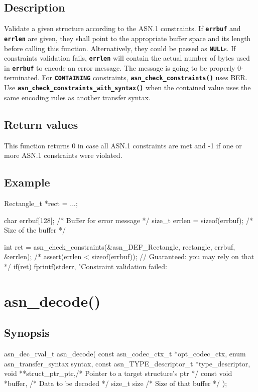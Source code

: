 \documentclass[english,oneside,12pt]{book}
\newcommand{\apisection}[2]{\clearpage\section{\label{#1}#2}}
\newcommand{\code}[1]{\texttt{\textbf{\lstinline{#1}}}}
\begin{document}
\subsection*{Description}

Validate a given structure according to the ASN.1 constraints.
If \code{errbuf} and \code{errlen} are given, they shall point to the
appropriate buffer space and its length before calling this function.
Alternatively, they could be passed as \code{NULL}s.
If constraints validation fails, \code{errlen} will contain the actual
number of bytes used in \code{errbuf} to encode an error message.
The message is going to be properly 0-terminated.
For \code{CONTAINING} constraints, \code{asn_check_constraints()} uses BER.
Use \code{asn_check_constraints_with_syntax()} when the contained value uses
the same encoding rules as another transfer syntax.

\subsection*{Return values}

This function returns 0 in case all ASN.1 constraints are met
and -1 if one or more ASN.1 constraints were violated.

\subsection*{Example}

\begin{codesample}[basicstyle=\scriptsize\listingfont,literate={-}{{\char45}}1]
Rectangle_t *rect = ...;

char errbuf[128];  /* Buffer for error message */
size_t errlen = sizeof(errbuf);  /* Size of the buffer */

int ret = asn_check_constraints(&asn_DEF_Rectangle, rectangle, errbuf, &errlen);
/* assert(errlen < sizeof(errbuf)); // Guaranteed: you may rely on that */
if(ret) {
    fprintf(stderr, "Constraint validation failed: %
}
\end{codesample}

\apisection{sec:asn_decode}{asn\_decode()}

\subsection*{Synopsis}
\begin{signature}
asn_dec_rval_t asn_decode(
    const asn_codec_ctx_t *opt_codec_ctx,
    enum asn_transfer_syntax syntax,
    const asn_TYPE_descriptor_t *type_descriptor,
    void **struct_ptr_ptr,/* Pointer to a target structure's ptr */
    const void *buffer,   /* Data to be decoded */
    size_t size           /* Size of that buffer */
);
\end{signature}
\end{document}
